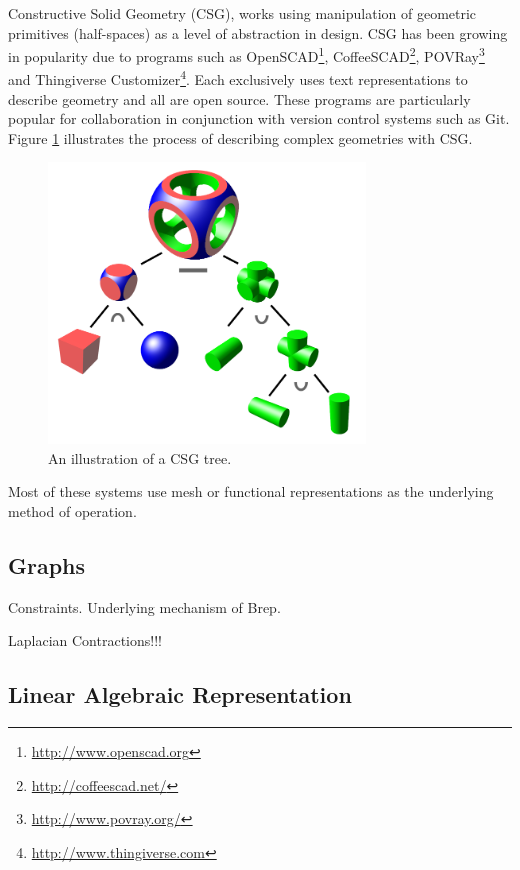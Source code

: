 \documentclass[a4paper]{article}
\begin{document}
Constructive Solid Geometry (CSG), works using manipulation of
geometric primitives (half-spaces) as a level of abstraction in design.
CSG has been growing in popularity due
to programs such as OpenSCAD\footnote{\url{http://www.openscad.org}},
CoffeeSCAD\footnote{\url{http://coffeescad.net/}},
POVRay\footnote{\url{http://www.povray.org/}}
and Thingiverse Customizer\footnote{\url{http://www.thingiverse.com}}.
Each exclusively uses text representations to describe geometry and all
are open source.
These programs are particularly popular for collaboration
in conjunction with version control systems such as Git.
Figure \ref{fig:csgtree} illustrates the process of describing complex
geometries with CSG.

\begin{figure}[h!]
  \centering
    \includegraphics[width=0.75\textwidth]{img/csg_tree.png}
  \caption{An illustration of a CSG tree.}
  \label{fig:csgtree}
\end{figure}

Most of these systems use mesh or functional representations as the
underlying method of operation.

\subsection{Graphs}

Constraints. Underlying mechanism of Brep.

Laplacian Contractions!!!
\cite{Cao_Tagliasacchi_Olson_Zhang_Su_2010}

\subsection{Linear Algebraic Representation}
\cite{DiCarlo_Paoluzzi_Shapiro_2014}
\end{document}
